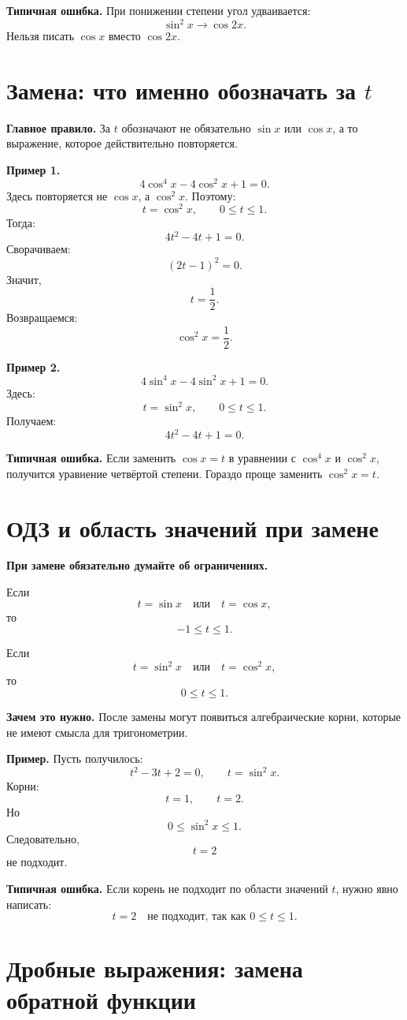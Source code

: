 \documentclass[a4paper,12pt]{article}
\newcommand{\sectionline}{\vspace{1mm}{\color{accent}\hrule height 0.6pt}\vspace{2mm}}
\newcommand{\important}[1]{\textcolor{darkaccent}{\textbf{#1}}}
\newcommand{\warning}[1]{\textcolor{warn}{\textbf{#1}}}
\begin{document}
\warning{Типичная ошибка.}
При понижении степени угол удваивается:
\[
\sin^2x \longrightarrow \cos 2x.
\]
Нельзя писать \(\cos x\) вместо \(\cos 2x\).

\section{Замена: что именно обозначать за \(t\)}
\sectionline

\important{Главное правило.}
За \(t\) обозначают не обязательно \(\sin x\) или \(\cos x\), а то выражение, которое действительно повторяется.

\important{Пример 1.}
\[
4\cos^4x-4\cos^2x+1=0.
\]
Здесь повторяется не \(\cos x\), а \(\cos^2x\). Поэтому:
\[
t=\cos^2x,\qquad 0\le t\le1.
\]
Тогда:
\[
4t^2-4t+1=0.
\]
Сворачиваем:
\[
(2t-1)^2=0.
\]
Значит,
\[
t=\frac12.
\]
Возвращаемся:
\[
\cos^2x=\frac12.
\]

\important{Пример 2.}
\[
4\sin^4x-4\sin^2x+1=0.
\]
Здесь:
\[
t=\sin^2x,\qquad 0\le t\le1.
\]
Получаем:
\[
4t^2-4t+1=0.
\]

\warning{Типичная ошибка.}
Если заменить \(\cos x=t\) в уравнении с \(\cos^4x\) и \(\cos^2x\), получится уравнение четвёртой степени. Гораздо проще заменить \(\cos^2x=t\).

\section{ОДЗ и область значений при замене}
\sectionline

\important{При замене обязательно думайте об ограничениях.}

Если
\[
t=\sin x
\quad\text{или}\quad
t=\cos x,
\]
то
\[
-1\le t\le1.
\]

Если
\[
t=\sin^2x
\quad\text{или}\quad
t=\cos^2x,
\]
то
\[
0\le t\le1.
\]

\important{Зачем это нужно.}
После замены могут появиться алгебраические корни, которые не имеют смысла для тригонометрии.

\important{Пример.}
Пусть получилось:
\[
t^2-3t+2=0,
\qquad
t=\sin^2x.
\]
Корни:
\[
t=1,\qquad t=2.
\]
Но
\[
0\le \sin^2x\le1.
\]
Следовательно,
\[
t=2
\]
не подходит.

\warning{Типичная ошибка.}
Если корень не подходит по области значений \(t\), нужно явно написать:
\[
t=2\quad \text{не подходит, так как }0\le t\le1.
\]

\section{Дробные выражения: замена обратной функции}
\sectionline
\end{document}
